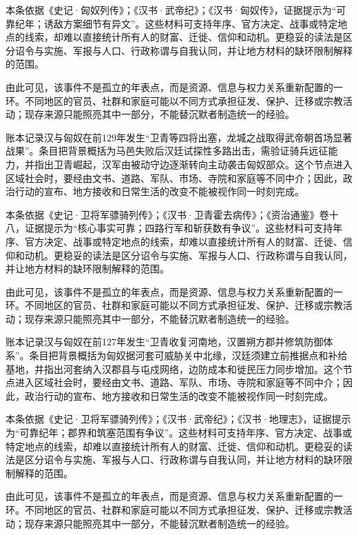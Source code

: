 本条依据《史记·匈奴列传》；《汉书·武帝纪》；《汉书·匈奴传》，证据提示为“可靠纪年；诱敌方案细节有异文”。这些材料可支持年序、官方决定、战事或特定地点的线索，却难以直接统计所有人的财富、迁徙、信仰和动机。更稳妥的读法是区分诏令与实施、军报与人口、行政称谓与自我认同，并让地方材料的缺环限制解释的范围。

由此可见，该事件不是孤立的年表点，而是资源、信息与权力关系重新配置的一环。不同地区的官员、社群和家庭可能以不同方式承担征发、保护、迁移或宗教活动；现存来源只能照亮其中一部分，不能替沉默者制造统一的经验。

账本记录汉与匈奴在前129年发生“卫青等四将出塞，龙城之战取得武帝朝首场显著战果”。条目把背景概括为马邑失败后汉廷试探性多路出击，需验证骑兵远征能力，并指出卫青崛起，汉军由被动守边逐渐转向主动袭击匈奴部众。这个节点进入区域社会时，要经由文书、道路、军队、市场、寺院和家庭等不同中介；因此，政治行动的宣布、地方接收和日常生活的改变不能被视作同一时刻完成。

本条依据《史记·卫将军骠骑列传》；《汉书·卫青霍去病传》；《资治通鉴》卷十八，证据提示为“核心事实可靠；四路行军和斩获数有争议”。这些材料可支持年序、官方决定、战事或特定地点的线索，却难以直接统计所有人的财富、迁徙、信仰和动机。更稳妥的读法是区分诏令与实施、军报与人口、行政称谓与自我认同，并让地方材料的缺环限制解释的范围。

由此可见，该事件不是孤立的年表点，而是资源、信息与权力关系重新配置的一环。不同地区的官员、社群和家庭可能以不同方式承担征发、保护、迁移或宗教活动；现存来源只能照亮其中一部分，不能替沉默者制造统一的经验。

账本记录汉与匈奴在前127年发生“卫青收复河南地，汉置朔方郡并修筑防御体系”。条目把背景概括为匈奴据河套可威胁关中北缘，汉廷须建立前推据点和补给基地，并指出河套纳入汉郡县与屯戍网络，边防成本和徙民压力同步增加。这个节点进入区域社会时，要经由文书、道路、军队、市场、寺院和家庭等不同中介；因此，政治行动的宣布、地方接收和日常生活的改变不能被视作同一时刻完成。

本条依据《史记·卫将军骠骑列传》；《汉书·武帝纪》；《汉书·地理志》，证据提示为“可靠纪年；郡界和筑塞范围有争议”。这些材料可支持年序、官方决定、战事或特定地点的线索，却难以直接统计所有人的财富、迁徙、信仰和动机。更稳妥的读法是区分诏令与实施、军报与人口、行政称谓与自我认同，并让地方材料的缺环限制解释的范围。

由此可见，该事件不是孤立的年表点，而是资源、信息与权力关系重新配置的一环。不同地区的官员、社群和家庭可能以不同方式承担征发、保护、迁移或宗教活动；现存来源只能照亮其中一部分，不能替沉默者制造统一的经验。

